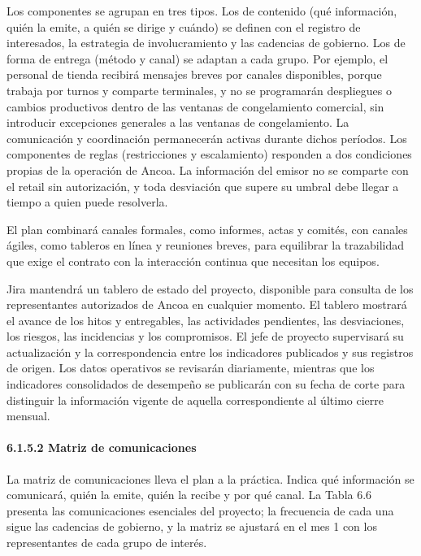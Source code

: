 \documentclass[11pt]{article}
\begin{document}
Los componentes se agrupan en tres tipos. Los de contenido (qué
información, quién la emite, a quién se dirige y cuándo) se definen con
el registro de interesados, la estrategia de involucramiento y las
cadencias de gobierno. Los de forma de entrega (método y canal) se
adaptan a cada grupo. Por ejemplo, el personal de tienda recibirá
mensajes breves por canales disponibles, porque trabaja por turnos y
comparte terminales, y no se programarán despliegues o cambios
productivos dentro de las ventanas de congelamiento comercial, sin
introducir excepciones generales a las ventanas de congelamiento. La
comunicación y coordinación permanecerán activas durante dichos
períodos. Los componentes de reglas (restricciones y escalamiento)
responden a dos condiciones propias de la operación de Ancoa. La
información del emisor no se comparte con el retail sin autorización, y
toda desviación que supere su umbral debe llegar a tiempo a quien puede
resolverla.

El plan combinará canales formales, como informes, actas y comités, con
canales ágiles, como tableros en línea y reuniones breves, para
equilibrar la trazabilidad que exige el contrato con la interacción
continua que necesitan los equipos.

Jira mantendrá un tablero de estado del proyecto, disponible para
consulta de los representantes autorizados de Ancoa en cualquier
momento. El tablero mostrará el avance de los hitos y entregables, las
actividades pendientes, las desviaciones, los riesgos, las incidencias y
los compromisos. El jefe de proyecto supervisará su actualización y la
correspondencia entre los indicadores publicados y sus registros de
origen. Los datos operativos se revisarán diariamente, mientras que los
indicadores consolidados de desempeño se publicarán con su fecha de
corte para distinguir la información vigente de aquella correspondiente
al último cierre mensual.

\paragraph{6.1.5.2 Matriz de comunicaciones}\label{6-1-5-2-matriz-de-comunicaciones}

La matriz de comunicaciones lleva el plan a la práctica. Indica qué información se comunicará, quién la emite, quién la recibe y por qué canal. La Tabla 6.6 presenta las comunicaciones esenciales del proyecto; la frecuencia de cada una sigue las cadencias de gobierno, y la matriz se ajustará en el mes 1 con los representantes de cada grupo de interés.
\end{document}
